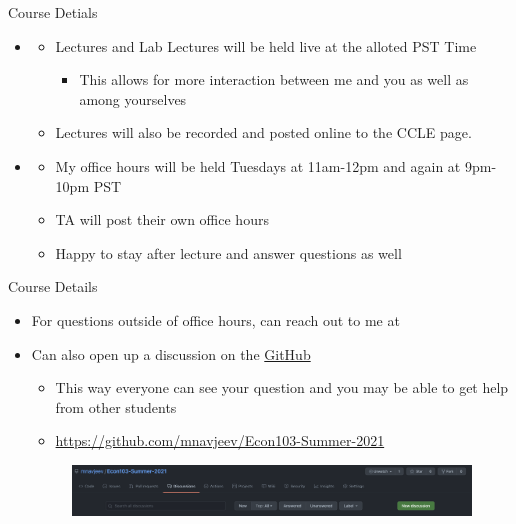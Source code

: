 \documentclass[notheorems,10pt]{beamer}
\begin{document}
\begin{frame}{Course Detials} 
	\begin{itemize}
		\item {}
		\begin{itemize}
			\item Lectures and Lab Lectures will be held live at the alloted PST Time
			\begin{itemize}
				\item This allows for more interaction between me and you as well as among yourselves
			\end{itemize}
			\item Lectures will also be recorded and posted online to the CCLE page.
		\end{itemize}
	\item {}
	\begin{itemize}
		\item My office hours will be held Tuesdays at 11am-12pm and again at 9pm-10pm PST
		\item TA will post their own office hours
		\item Happy to stay after lecture and answer questions as well
	\end{itemize}
	\end{itemize}
\end{frame}

\begin{frame}{Course Details} 
	\begin{itemize}
		\item For questions outside of office hours, can reach out to me at 
		\item Can also open up a discussion on the \href{https://github.com/mnavjeev/Econ103-Summer-2021}{GitHub} 
		\begin{itemize}
			\item This way everyone can see your question and you may be able to get help from other students
			\item \href{https://github.com/mnavjeev/Econ103-Summer-2021}{https://github.com/mnavjeev/Econ103-Summer-2021}
		\end{itemize}
		\begin{figure}[htpb]
			\centering
			\includegraphics[width=0.95\linewidth]{GitHub.png}
		\end{figure}
	\end{itemize}
\end{frame}
\end{document}
